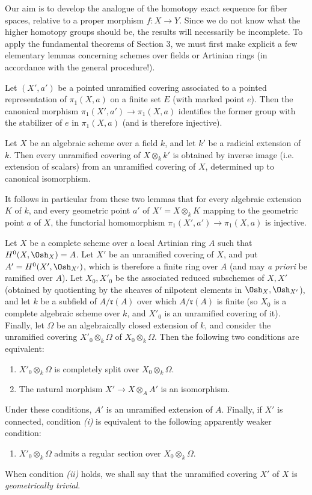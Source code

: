 Our aim is to develop the analogue of the homotopy exact sequence for fiber
spaces, relative to a proper morphism $f:X\longrightarrow Y$. Since we do not
know what the higher homotopy groups should be, the results will necessarily
be incomplete. To apply the fundamental theorems of Section 3, we must first
make explicit a few elementary lemmas concerning schemes over fields or
Artinian rings (in accordance with the general procedure!).

 Let $(X',a')$ be a pointed unramified covering associated to
a pointed representation of $\pi_1(X,a)$ on a finite set $E$ (with marked
point $e$). Then the canonical morphism
$\pi_1(X',a')\longrightarrow\pi_1(X,a)$ identifies the former group with the
stabilizer of $e$ in $\pi_1(X,a)$ (and is therefore injective).

 Let $X$ be an algebraic scheme over a field $k$, and let
$k'$ be a radicial extension of $k$. Then every unramified covering of
$X\otimes_k k'$ is obtained by inverse image (i.e. extension of scalars) from
an unramified covering of $X$, determined up to canonical isomorphism.

It follows in particular from these two lemmas that for every algebraic
extension $K$ of $k$, and every geometric point $a'$ of
$X'=X\otimes_k K$ mapping to the geometric point $a$ of $X$, the functorial
homomorphism $\pi_1(X',a')\longrightarrow\pi_1(X,a)$ is injective.

 Let $X$ be a complete scheme over a local Artinian ring $A$
such that $H^0(X,\Osh_X)=A$. Let $X'$ be an unramified covering of $X$, and
put $A'=H^0(X',\Osh_{X'})$, which is therefore a finite ring over $A$ (and may
\textit{a priori} be ramified over $A$). Let $X_0,X'_0$ be the associated
reduced subschemes of $X,X'$ (obtained by quotienting by the sheaves of
nilpotent elements in $\Osh_X,\Osh_{X'}$), and let $k$ be a subfield of
$A/\mathfrak r(A)$ over which $A/\mathfrak r(A)$ is finite (so $X_0$ is a
complete algebraic scheme over $k$, and $X'_0$ is an unramified covering of
it). Finally, let $\Omega$ be an algebraically closed extension of $k$, and
consider the unramified covering $X'_0\otimes_k\Omega$ of
$X_0\otimes_k\Omega$. Then the following two conditions are equivalent:
\begin{enumerate}
  \item[\textit{i.}] $X'_0\otimes_k\Omega$ is completely split over
    $X_0\otimes_k\Omega$.
  \item[\textit{ii.}] The natural morphism
    $X'\longrightarrow X\otimes_A A'$ is an isomorphism.
\end{enumerate}
Under these conditions, $A'$ is an unramified extension of $A$. Finally, if
$X'$ is connected, condition \textit{(i)} is equivalent to the following
apparently weaker condition:
\begin{enumerate}
  \item[\textit{i bis.}] $X'_0\otimes_k\Omega$ admits a regular section over
    $X_0\otimes_k\Omega$.
\end{enumerate}
When condition \textit{(ii)} holds, we shall say that the unramified covering
$X'$ of $X$ is \emph{geometrically trivial}.

